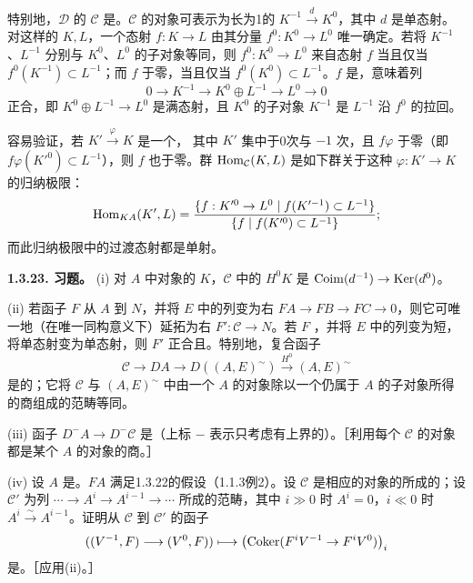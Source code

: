 特别地，$\mathcal D$ 的 $\mathcal C$ 是。$\mathcal C$ 的对象可表示为长为1的 $K^{-1}\xrightarrow{d}K^0$，其中 $d$ 是单态射。对这样的 $K,L$，一个态射 $f:K\to L$ 由其分量 $f^0:K^0\to L^0$ 唯一确定。若将 $K^{-1}$、$L^{-1}$ 分别与 $K^0$、$L^0$ 的子对象等同，则 $f^0:K^0\to L^0$ 来自态射 $f$ 当且仅当 $f^0(K^{-1})\subset L^{-1}$；而 $f$ 于零，当且仅当 $f^0(K^0)\subset L^{-1}$。$f$ 是，意味着列
\[
 0\longrightarrow K^{-1}\longrightarrow K^0\oplus L^{-1}\longrightarrow L^0\longrightarrow0
\]
正合，即 $K^0\oplus L^{-1}\to L^0$ 是满态射，且 $K^0$ 的子对象 $K^{-1}$ 是 $L^{-1}$ 沿 $f^0$ 的拉回。

容易验证，若 $K'\xrightarrow{\varphi}K$ 是一个，
其中 $K'$ 集中于0次与 $-1$ 次，且 $f\varphi$ 于零（即 $f\varphi(K'^0)\subset L^{-1}$），则 $f$ 也于零。群 $\operatorname{Hom}_{\mathcal C}(K,L)$ 是如下群关于这种 $\varphi:K'\to K$ 的归纳极限：
\[
 \operatorname{Hom}_{KA}(K',L)=
 \frac{\{f:K'^0\to L^0\mid f(K'^{-1})\subset L^{-1}\}}
 {\{f\mid f(K'^0)\subset L^{-1}\}};
\]
而此归纳极限中的过渡态射都是单射。

\par\medskip\noindent\textbf{1.3.23. 习题。} (i) 对 $A$ 中对象的 $K$，$\mathcal C$ 中的 $H^0K$ 是 $\mathrm{Coim}(d^{-1})\to\operatorname{Ker}(d^0)$。

(ii) 若函子 $F$ 从 $A$ 到 $N$，并将 $E$ 中的列变为右 $FA\to FB\to FC\to0$，则它可唯一地（在唯一同构意义下）延拓为右 $F':\mathcal C\to N$。若 $F$ ，并将 $E$ 中的列变为短，将单态射变为单态射，则 $F'$ 正合且。特别地，复合函子
\[
 \mathcal C\longrightarrow DA\longrightarrow D((A,E)^{\sim})\xrightarrow{H^0}(A,E)^{\sim}
\]
是的；它将 $\mathcal C$ 与 $(A,E)^{\sim}$ 中由一个 $A$ 的对象除以一个仍属于 $A$ 的子对象所得的商组成的范畴等同。

(iii) 函子 $D^-A\to D^-\mathcal C$ 是（上标 $-$ 表示只考虑有上界的）。［利用每个 $\mathcal C$ 的对象都是某个 $A$ 的对象的商。］

(iv) 设 $A$ 是。$FA$ 满足1.3.22的假设（1.1.3例2）。设 $\mathcal C$ 是相应的对象的所成的；设 $\mathcal C'$ 为列 $\cdots\to A^i\to A^{i-1}\to\cdots$ 所成的范畴，其中 $i\gg0$ 时 $A^i=0$，$i\ll0$ 时 $A^i\xrightarrow{\sim}A^{i-1}$。证明从 $\mathcal C$ 到 $\mathcal C'$ 的函子
\[
 ((V^{-1},F)\longrightarrow(V^0,F))\longmapsto
 \bigl(\operatorname{Coker}(F^iV^{-1}\to F^iV^0)\bigr)_i
\]
是。［应用(ii)。］

